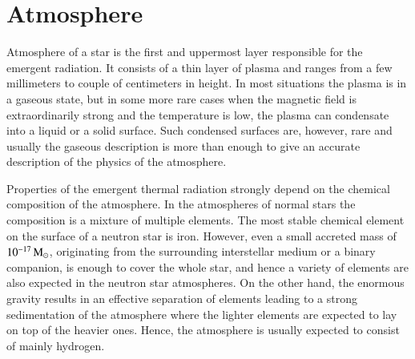 \section{Atmosphere}\label{sect:atmos}

Atmosphere of a star is the first and uppermost layer responsible for the emergent radiation.
It consists of a thin layer of plasma and ranges from a few millimeters to couple of centimeters in height.
In most situations the plasma is in a gaseous state, but in some more rare cases when the magnetic field is extraordinarily strong and the temperature is low, the plasma can condensate into a liquid or a solid surface.
Such condensed surfaces are, however, rare and usually the gaseous description is more than enough to give an accurate description of the physics of the atmosphere.\cite[for a review, see][]{ZP02, Potekhin14}


Properties of the emergent thermal radiation strongly depend on the chemical composition of the atmosphere.
In the atmospheres of normal stars the composition is a mixture of multiple elements.
The most stable chemical element on the surface of a neutron star is iron.
However, even a small accreted mass of $10^{-17}\, \mathrm{M}_{\odot}$, originating from the surrounding interstellar medium or a binary companion, is enough to cover the whole star, and hence a variety of elements are also expected in the neutron star atmospheres.
On the other hand, the enormous gravity results in an effective separation of elements leading to a strong sedimentation of the atmosphere where the lighter elements are expected to lay on top of the heavier ones.\cite{AI80}
Hence, the atmosphere is usually expected to consist of mainly hydrogen.


